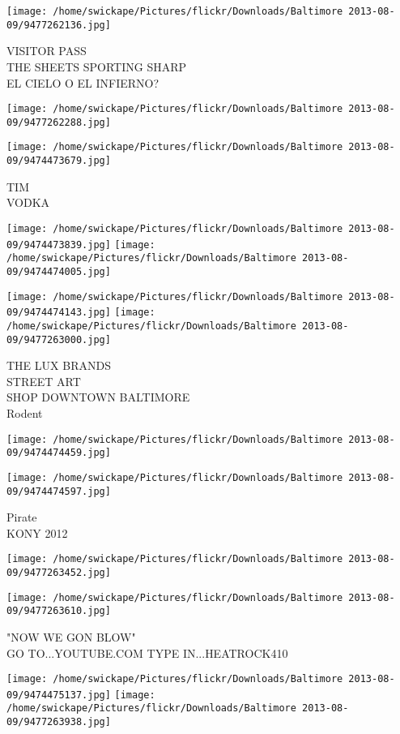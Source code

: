 \documentclass[10pt,letterpaper]{article}
\begin{document}
\texttt{[image: /home/swickape/Pictures/flickr/Downloads/Baltimore 2013-08-09/9477262136.jpg]}

VISITOR PASS\\
THE SHEETS SPORTING SHARP\\
EL CIELO O EL INFIERNO?
\pagebreak

\texttt{[image: /home/swickape/Pictures/flickr/Downloads/Baltimore 2013-08-09/9477262288.jpg]}

\vspace{0.25in}
\texttt{[image: /home/swickape/Pictures/flickr/Downloads/Baltimore 2013-08-09/9474473679.jpg]}

TIM\\
VODKA
\pagebreak

\texttt{[image: /home/swickape/Pictures/flickr/Downloads/Baltimore 2013-08-09/9474473839.jpg]}
\texttt{[image: /home/swickape/Pictures/flickr/Downloads/Baltimore 2013-08-09/9474474005.jpg]}

\texttt{[image: /home/swickape/Pictures/flickr/Downloads/Baltimore 2013-08-09/9474474143.jpg]}
\texttt{[image: /home/swickape/Pictures/flickr/Downloads/Baltimore 2013-08-09/9477263000.jpg]}

THE LUX BRANDS\\
STREET ART\\
SHOP DOWNTOWN BALTIMORE\\
Rodent
\pagebreak

\texttt{[image: /home/swickape/Pictures/flickr/Downloads/Baltimore 2013-08-09/9474474459.jpg]}

\vspace{0.25in}
\texttt{[image: /home/swickape/Pictures/flickr/Downloads/Baltimore 2013-08-09/9474474597.jpg]}

Pirate\\
KONY 2012
\pagebreak

\texttt{[image: /home/swickape/Pictures/flickr/Downloads/Baltimore 2013-08-09/9477263452.jpg]}

\vspace{0.25in}
\texttt{[image: /home/swickape/Pictures/flickr/Downloads/Baltimore 2013-08-09/9477263610.jpg]}

"NOW WE GON BLOW"\\
GO TO...YOUTUBE.COM TYPE IN...HEATROCK410
\pagebreak

\texttt{[image: /home/swickape/Pictures/flickr/Downloads/Baltimore 2013-08-09/9474475137.jpg]}
\texttt{[image: /home/swickape/Pictures/flickr/Downloads/Baltimore 2013-08-09/9477263938.jpg]}
\end{document}
